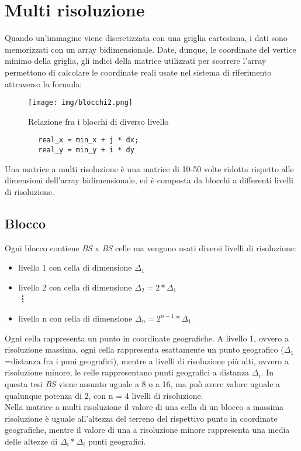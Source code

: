 \section{Multi risoluzione}
	
	Quando un'immagine viene discretizzata con una griglia cartesiana, i dati sono memorizzati con un array bidimensionale. Date, dunque, le coordinate del vertice minimo della griglia, gli indici della matrice utilizzati per scorrere l'array permettono di calcolare le coordinate reali usate nel sistema di riferimento attraverso la formula:
	\newpage
	\begin{figure}[b]
		\centering
		\texttt{[image: img/blocchi2.png]}
		\caption{Relazione fra i blocchi di diverso livello}
	\end{figure}
	\begin{verbatim}
		real_x = min_x + j * dx;
		real_y = min_y + i * dy
	\end{verbatim} 
	Una matrice a multi risoluzione \`{e} una matrice di 10-50 volte ridotta rispetto alle dimensioni dell'array bidimensionale, ed \`{e} composta da blocchi a differenti livelli di risoluzione.   
	 
	\subsection{Blocco}  
	Ogni blocco contiene \textit{BS} x \textit{BS} celle ma vengono usati diversi livelli di risoluzione: 
	\begin{itemize}
		\item livello 1 con cella di dimensione $\Delta_1$
		\item livello 2 con cella di dimensione $\Delta_2 = 2 * \Delta_1$ \\
		\textbf{\vdots}
		\item livello n con cella di dimensione $\Delta_n = 2^{n-1} * \Delta_1$
	\end{itemize}
	Ogni cella rappresenta un punto in coordinate geografiche. A livello 1, ovvero a risoluzione massima, ogni cella rappresenta esattamente un punto geografico ($\Delta_1$=distanza fra i puni geografici), mentre a livelli di risoluzione pi\`{u} alti, ovvero a risoluzione minore, le celle rappresentano punti geografici a distanza $\Delta_i$. 
	In questa tesi \textit{BS} viene assunto uguale a 8 o a 16, ma pu\`{o} avere valore uguale a qualunque potenza di 2, con n = 4 livelli di risoluzione.\\
	Nella matrice a multi risoluzione il valore di una cella di un blocco a massima risoluzione \`{e} uguale all'altezza del terreno del rispettivo punto in coordinate geografiche, mentre il valore di una a risoluzione minore rappresenta una media delle altezze di $\Delta_i * \Delta_i$ punti geografici.
	\newpage
